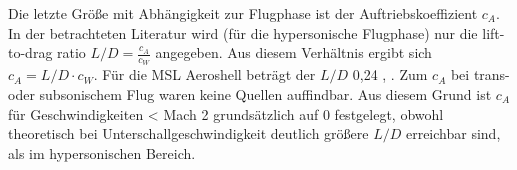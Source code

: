 Die letzte Größe mit Abhängigkeit zur Flugphase ist der Auftriebskoeffizient $c_A$. In der betrachteten Literatur wird (für die hypersonische Flugphase) nur die lift-to-drag ratio $L/D = \frac{c_A}{c_W}$ angegeben. Aus diesem Verhältnis ergibt sich $c_A = L/D \cdot c_W$. Für die MSL Aeroshell beträgt der $L/D$ 0,24 \cite{Way2007}, \cite{Edquist2009}. Zum $c_A$ bei trans- oder subsonischem Flug waren keine Quellen auffindbar. Aus diesem Grund ist $c_A$ für Geschwindigkeiten < Mach 2 grundsätzlich auf 0 festgelegt, obwohl theoretisch bei Unterschallgeschwindigkeit deutlich größere $L/D$ erreichbar sind, als im hypersonischen Bereich.